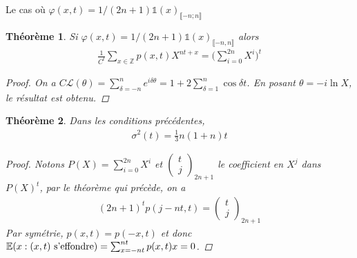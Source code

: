 \documentclass{article}
\newtheorem{theorem}{Théorème}[section]
\theoremstyle{definition}
\begin{document}
\begin{section}{Le cas où $\varphi(x, t) = 1/(2n+1)\mathds{1}(x)_{\llbracket -n; n\rrbracket}$}
\begin{theorem}
	Si $\varphi(x, t) =1/(2n+1)\mathds{1}(x)_{\llbracket -n,n\rrbracket}$ alors 
	\begin{align*}
	  \frac{1}{C^t} \sum_{x\in\mathbb{Z}}p(x,t) X^{nt+x} = \bigg(\sum_{i=0}^{2n} X^i\bigg)^t\end{align*}
	  \begin{proof}
		  On a $C\mathcal{L}(\theta) = \sum_{\delta=-n}^{n} e^{i\delta \theta} = 1 + 2\sum_{\delta=1}^n \cos \delta t$. En posant $\theta = -i \ln X$, le résultat est obtenu.

	  \end{proof}
\end{theorem}
\begin{theorem}
	Dans les conditions précédentes,  
	\begin{align*}
		\sigma^2(t) = \frac{1}{3} n (1+n) t
	\end{align*}
	\begin{proof}
		Notons $P(X) = \sum_{i=0}^{2n} X^i$ et $\begin{pmatrix}t\\j\end{pmatrix}_{2n+1}$ le coefficient en $X^j$ dans $P(X)^t$, par le théorème qui précède, on a
		\begin{align*}
			(2n+1)^t p(j-nt,t) = \begin{pmatrix} t\\j \end{pmatrix}_{2n+1}
		\end{align*}
		Par symétrie, $p(x,t) = p(-x,t)$ et donc $\mathbb{E}(x : (x,t) \textup{ s'effondre}) = \sum_{x=-n t}^{n t} p(x,t) x = 0$.


\end{proof}
\end{theorem}
\end{section}
\end{document}
